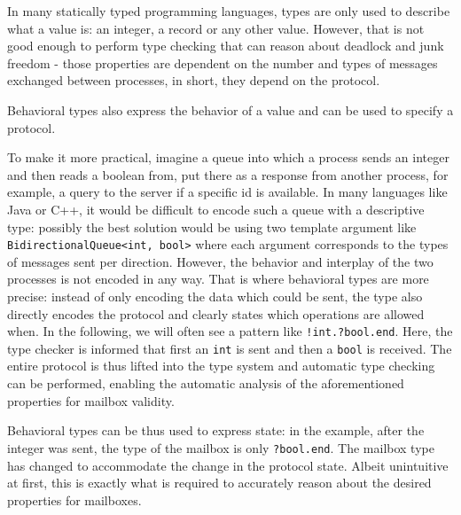 In many statically typed programming languages, types are only used to describe what a value is: an integer, a record or any other value.
However, that is not good enough to perform type checking that can reason about deadlock and junk freedom - those properties are dependent on the number and types of messages exchanged between processes, in short, they depend on the protocol.

Behavioral types also express the behavior of a value and can be used to specify a protocol\cite{huttelFoundationsSessionTypes2016}.

To make it more practical, imagine a queue into which a process sends an integer and then reads a boolean from, put there as a response from another process, for example, a query to the server if a specific id is available.
In many languages like Java or C++, it would be difficult to encode such a queue with a descriptive type: possibly the best solution would be using two template argument like \lstinline{BidirectionalQueue<int, bool>} where each argument corresponds to the types of messages sent per direction.
However, the behavior and interplay of the two processes is not encoded in any way.
That is where behavioral types are more precise: instead of only encoding the data which could be sent, the type also directly encodes the protocol and clearly states which operations are allowed when.
In the following, we will often see a pattern like \lstinline{!int.?bool.end}.
Here, the type checker is informed that first an \lstinline{int} is sent and then a \lstinline{bool} is received.
The entire protocol is thus lifted into the type system and automatic type checking can be performed, enabling the automatic analysis of the aforementioned properties for mailbox validity.

Behavioral types can be thus used to express state: in the example, after the integer was sent, the type of the mailbox is only \lstinline{?bool.end}.
The mailbox type has changed to accommodate the change in the protocol state.
Albeit unintuitive at first, this is exactly what is required to accurately reason about the desired properties for mailboxes.





